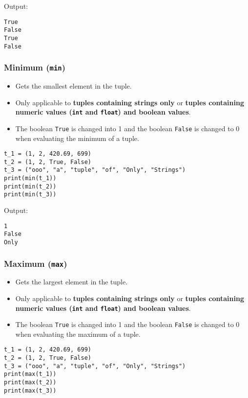 \documentclass[11pt]{article}
\begin{document}
 \noindent Output:

\label{org0f9a8a2}
\begin{verbatim}
True
False
True
False
\end{verbatim}
\subsubsection{Minimum (\texttt{min})}
\label{sec:orgea2234f}
\begin{itemize}
\item Gets the smallest element in the tuple.
\item Only applicable to \textbf{tuples containing strings only} or \textbf{tuples containing numeric values (\texttt{int} and \texttt{float}) and boolean values}.
\item The boolean \texttt{True} is changed into 1 and the boolean \texttt{False} is changed to 0 when evaluating the minimum of a tuple.
\end{itemize}

\begin{verbatim}
t_1 = (1, 2, 420.69, 699)
t_2 = (1, 2, True, False)
t_3 = ("ooo", "a", "tuple", "of", "Only", "Strings")
print(min(t_1))
print(min(t_2))
print(min(t_3))
\end{verbatim}

 \noindent Output:

\label{org4904c55}
\begin{verbatim}
1
False
Only
\end{verbatim}
\subsubsection{Maximum (\texttt{max})}
\label{sec:org73be6b9}
\begin{itemize}
\item Gets the largest element in the tuple.
\item Only applicable to \textbf{tuples containing strings only} or \textbf{tuples containing numeric values (\texttt{int} and \texttt{float}) and boolean values}.
\item The boolean \texttt{True} is changed into 1 and the boolean \texttt{False} is changed to 0 when evaluating the maximum of a tuple.
\end{itemize}

\begin{verbatim}
t_1 = (1, 2, 420.69, 699)
t_2 = (1, 2, True, False)
t_3 = ("ooo", "a", "tuple", "of", "Only", "Strings")
print(max(t_1))
print(max(t_2))
print(max(t_3))
\end{verbatim}
\end{document}
